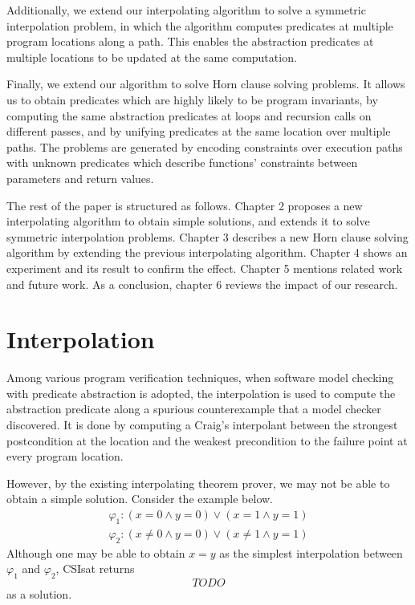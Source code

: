 \documentclass[master,final,12pt]{iscs-thesis}
\begin{document}
Additionally, we extend our interpolating algorithm to solve a
symmetric interpolation problem, in which the algorithm computes
predicates at multiple program locations along a path.  This enables
the abstraction predicates at multiple locations to be updated at the
same computation.

Finally, we extend our algorithm to solve Horn clause solving
problems.  It allows us to obtain predicates which are highly likely
to be program invariants, by computing the same abstraction predicates
at loops and recursion calls on different passes, and by unifying
predicates at the same location over multiple paths.  The problems are
generated by encoding constraints over execution paths with unknown
predicates which describe functions' constraints between parameters
and return values.

The rest of the paper is structured as follows.  Chapter 2 proposes a
new interpolating algorithm to obtain simple solutions, and extends it
to solve symmetric interpolation problems.  Chapter 3 describes a new
Horn clause solving algorithm by extending the previous interpolating
algorithm.  Chapter 4 shows an experiment and its result to confirm
the effect.  Chapter 5 mentions related work and future work.  As a
conclusion, chapter 6 reviews the impact of our research.


\chapter{Interpolation}

Among various program verification techniques, when software model
checking with predicate abstraction is adopted, the interpolation is
used to compute the abstraction predicate along a spurious
counterexample that a model checker discovered.  It is done by
computing a Craig's interpolant between the strongest postcondition at
the location and the weakest precondition to the failure point at
every program location.

However, by the existing interpolating theorem prover, we may not be
able to obtain a simple solution.  Consider the example below.
\begin{align*}
\varphi_1 : (x = 0 \wedge y = 0) \vee (x = 1 \wedge y = 1) \\
\varphi_2 : (x \neq 0 \wedge y = 0) \vee (x \neq 1 \wedge y = 1)
\end{align*}
Although one may be able to obtain $x = y$ as the simplest
interpolation between $\varphi_1$ and $\varphi_2$, CSIsat\cite{csisat}
returns
\[ TODO \]
as a solution.
\end{document}
